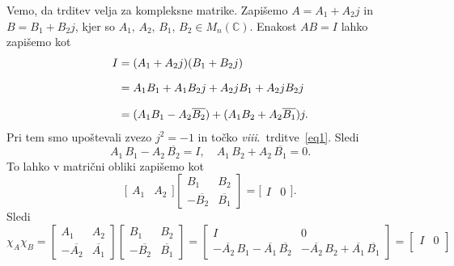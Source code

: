 \documentclass[mat1, tisk]{fmfdelo}
\numberwithin{equation}{section}
\begin{document}
\begin{dokaz}
    Vemo, da trditev velja za kompleksne matrike.
    Zapišemo $A = A_{1} + A_{2}j$ in $B = B_{1} + B_{2}j$, kjer so $A_{1}, \, A_{2}, \, B_{1}, \, B_{2} \in M_{n} (\mathbb{C})$.
    Enakost $AB = I$ 
    lahko zapišemo kot
    \begin{equation*}
        \setlength{\jot}{10pt}
            \begin{aligned}
                I &=(A_{1} + A_{2}j)(B_{1} + B_{2}j) \\
                &= A_{1}B_{1} + A_{1}B_{2}j + A_{2}jB_{1} + A_{2}jB_{2}j \\
                &= (A_{1}B_{1} - A_{2}\overline{B_{2}})+(A_{1}B_{2} + A_{2}\overline{B_{1}})j.
            \end{aligned}  
    \end{equation*} 
    Pri tem smo upoštevali zvezo $j^2 = -1$ in točko \textit{viii}.\ trditve~\ref{eq1}.
    Sledi
    $$A_{1} \, B_{1} - A_{2} \, \overline{B_{2}} = I, \quad A_{1} \, B_{2} + A_{2} \, \overline{B_{1}} = 0.$$
    To lahko v matrični obliki zapišemo kot
        $$\big[ \begin{matrix}
            A_{1} & A_{2}
        \end{matrix} \big]
        \begin{bmatrix}
            B_{1} & B_{2}\\
            -\overline{B_{2}} & \overline{B_{1}}
        \end{bmatrix}
        = 
        \big[\begin{matrix}
            I & 0
        \end{matrix} \big].$$
    Sledi
    $$\chi_{A} \chi_{B} =
    \begin{bmatrix}
        A_{1} & A_{2} \\
        -\overline{A_{2}} & \overline{A_{1}}
    \end{bmatrix}
    \begin{bmatrix}
        B_{1} & B_{2}\\
        -\overline{B_{2}} & \overline{B_{1}}
    \end{bmatrix} 
    =
    \begin{bmatrix}
        I & 0\\
        -\overline{A_{2}} \, B_{1} - \overline{A_{1}} \, \overline{B_{2}} & -\overline{A_{2}} \, B_{2} + \overline{A_{1}} \, \overline{B_{1}}
    \end{bmatrix} 
    =
    \begin{bmatrix}
        I & 0\\

\end{bmatrix}$$
\end{dokaz}
\end{document}
